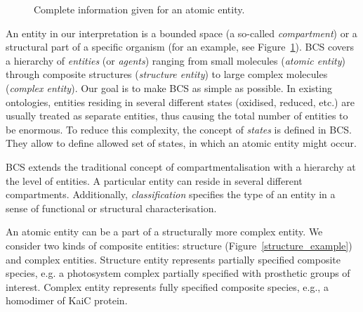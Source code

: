 \documentclass[12pt]{fithesis2}
\begin{document}
\begin{figure}[!h]
\begin{center}
\end{center}
\caption{Complete information given for an atomic entity.}\label{entity_example}
\end{figure}

An entity in our interpretation is a bounded space (a so-called \emph{compartment}) or a structural part of a specific organism (for an example, see Figure~\ref{entity_example}). BCS covers a hierarchy of \emph{entities} (or \emph{agents}) ranging from small molecules (\emph{atomic entity}) through composite structures (\emph{structure entity}) to large complex molecules (\emph{complex entity}). Our goal is to make BCS as simple as possible. In existing ontologies, entities residing in several different states (oxidised, reduced, etc.) are usually treated as separate entities, thus causing the total number of entities to be enormous. To reduce this complexity, the concept of \emph{states} is defined in BCS. They allow to define allowed set of states, in which an atomic entity might occur.

BCS extends the traditional concept of compartmentalisation with a hierarchy at the level of entities. A particular entity can reside in several different compartments. Additionally, \emph{classification} specifies the type of an entity in a sense of functional or structural characterisation.

An atomic entity can be a part of a structurally more complex entity. We consider two kinds of composite entities: structure (Figure~\ref{structure_example}) and complex entities. Structure entity represents partially specified composite species, e.g. a photosystem complex partially specified with prosthetic groups of interest. Complex entity represents fully specified composite species, e.g., a homodimer of KaiC protein.
\end{document}
